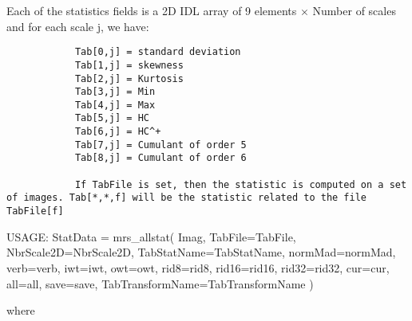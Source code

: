 Each of the statistics fields is a 2D IDL array of 9 elements $\times$ Number of scales and for each scale j, we have:
\begin{verbatim}
			Tab[0,j] = standard deviation
			Tab[1,j] = skewness
			Tab[2,j] = Kurtosis
			Tab[3,j] = Min
			Tab[4,j] = Max 
			Tab[5,j] = HC
			Tab[6,j] = HC^+
			Tab[7,j] = Cumulant of order 5
			Tab[8,j] = Cumulant of order 6

			If TabFile is set, then the statistic is computed on a set of images. Tab[*,*,f] will be the statistic related to the file TabFile[f]
\end{verbatim}
{\bf
\begin{center}
     USAGE: StatData = mrs\_allstat( Imag, TabFile=TabFile, NbrScale2D=NbrScale2D, TabStatName=TabStatName, normMad=normMad, verb=verb, 
     iwt=iwt, owt=owt, rid8=rid8, rid16=rid16, rid32=rid32, cur=cur, all=all, save=save, TabTransformName=TabTransformName )
\end{center}}
where 
